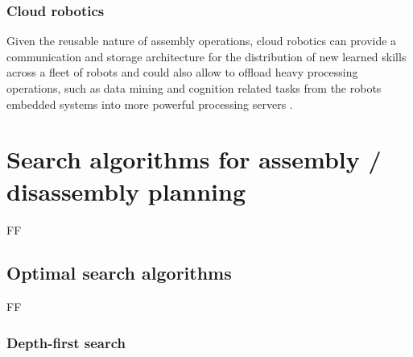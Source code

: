 \subsubsection{Cloud robotics}

Given the reusable nature of assembly operations, cloud robotics can provide a communication and storage architecture for the distribution of new learned skills across a fleet of robots \cite{Tenorth2013,Stenmark2015T} and could also allow to offload heavy processing operations, such as data mining \cite{Witten2005} and cognition related tasks \cite{Beetz2010,Tenorth2013k,Saxena2014,Beetz2015} from the robots embedded systems into more powerful processing servers \cite{Hunziker2013}.




\section{Search algorithms for assembly / disassembly planning}

FF

\subsection{Optimal search algorithms}

FF


\subsubsection{Depth-first search}

